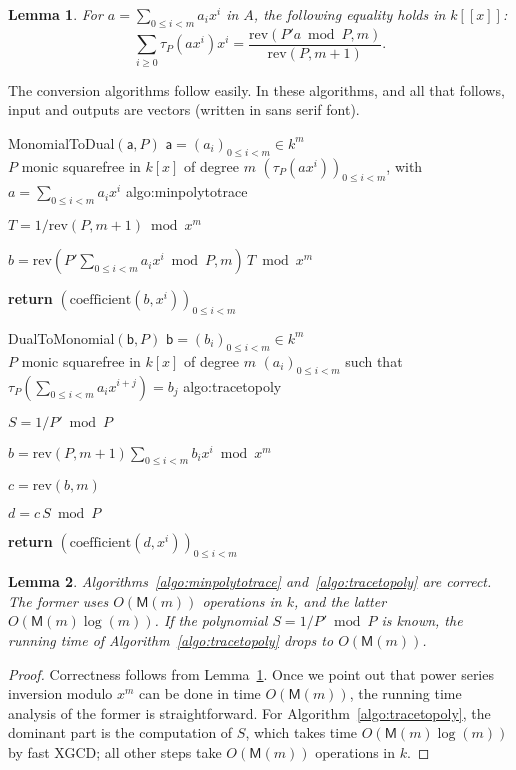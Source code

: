 \documentclass{sig-alternate}
\def\M {\ensuremath{\mathsf{M}}}
\def\va {\ensuremath{\mathsf{a}}}
\def\vb {\ensuremath{\mathsf{b}}}
\def\coeff {\ensuremath{\mathrm{coefficient}}}
\def\rev {\ensuremath{\mathrm{rev}}}
\newcounter{algo}
\newenvironment{algorithm_noendline}[4]{\small\begin{center}\begin{minipage}{0.48\textwidth}
      \refstepcounter{algo}
      \label{#4}
      \sf
      \rule{\textwidth}{0.2pt}\\
      \makebox[\textwidth][c]{Algorithm~\arabic{algo}:~\textbf{#1}}\\
      \rule[0.5\baselineskip]{\textwidth}{0.2pt}\\

      \vspace{-12pt}

      \parbox{\textwidth}{\textbf{Input} #2}
      \parbox{\textwidth}{\textbf{Output} #3}

\vspace{-7pt}

      \begin{enumerate*}}{\end{enumerate*}
      \vspace{-11pt}
\end{minipage}\end{center}
}
\newenvironment{algorithm_endline}[4]{\small\begin{center}\begin{minipage}{0.48\textwidth}
      \refstepcounter{algo}
      \label{#4}
      \sf
      \rule{\textwidth}{0.2pt}\\
      \makebox[\textwidth][c]{Algorithm~\arabic{algo}:~\textbf{#1}}\\
      \rule[0.5\baselineskip]{\textwidth}{0.2pt}\\

      \vspace{-12pt}

      \parbox{\textwidth}{\textbf{Input} #2}
      \parbox{\textwidth}{\textbf{Output} #3}

\vspace{-7pt}

      \begin{enumerate*}}{\end{enumerate*}
      \vspace{-11pt}
      \rule{\textwidth}{0.2pt}
\end{minipage}\end{center}
}
\newtheorem{Lemma}{Lemma}
\begin{document}
\begin{Lemma}\label{lemma:trace:1}
  For $a=\sum_{0 \le i < m} a_i x^i$ in $A$, the following equality
  holds in $k[[x]]$:
  $$\sum_{i \ge 0} \tau_P(a x^i) x^i = \frac{\rev( P' a \bmod P,m)}{\rev(P,m+1)}.$$
\end{Lemma}

The conversion algorithms follow easily. In these algorithms, and all
that follows, input and outputs are vectors (written in {\sf sans
  serif} font).

\begin{algorithm_noendline}
{MonomialToDual$(\va,P)$}
{$\va=(a_i)_{0 \le i < m} \in k^m$ \\  $P$ monic squarefree in $k[x]$ of degree $m$}
{$(\tau_P(a x^i))_{0 \le i < m}$, with $a=\sum_{0 \le i < m} a_i x^i$}
{algo:minpolytotrace}
\item $T = 1/\rev(P, m+1) \bmod x^m$
\item $b = \rev(P' \sum_{0 \le i < m} a_i x^i \bmod P, m)\, T \bmod x^m$
\item {\bf return} $(\coeff(b,x^i))_{0 \le i < m}$
\end{algorithm_noendline}

\begin{algorithm_endline}
{DualToMonomial$(\vb, P)$}
{$\vb=(b_i)_{0 \le i < m} \in k^m$\\ $P$ monic squarefree in $k[x]$ of degree $m$}
{$(a_i)_{0 \le i < m}$ such that $\tau_P(\sum_{0 \le i < m} a_i x^{i+j}) = b_j$}
{algo:tracetopoly}
\item $S = 1/P' \bmod P$
\item $b= \rev(P,m+1) \sum_{0 \le i < m} b_i x^i \bmod x^m$
\item $c= \rev(b, m)$
\item $d =c\, S \bmod P$
\item {\bf return} $(\coeff(d,x^i))_{0 \le i < m}$
\end{algorithm_endline}

\begin{Lemma}\label{lemma:uniconv}
  Algorithms~\ref{algo:minpolytotrace} and~\ref{algo:tracetopoly} are
  correct. The former uses $O(\M(m))$ operations in $k$, and the
  latter $O(\M(m)\log(m))$.  If the polynomial $S=1/P' \bmod P$ is
  known, the running time of Algorithm~\ref{algo:tracetopoly} drops to
  $O(\M(m))$.
\end{Lemma}
\begin{proof}
  Correctness follows from Lemma~\ref{lemma:trace:1}.  Once we point
  out that power series inversion modulo $x^m$ can be done in time
  $O(\M(m))$, the running time analysis of the former is
  straightforward. For Algorithm~\ref{algo:tracetopoly}, the dominant
  part is the computation of $S$, which takes time $O(\M(m)\log(m))$
  by fast XGCD; all other steps take $O(\M(m))$ operations in $k$.
\end{proof}
\end{document}
